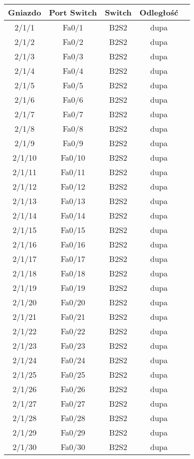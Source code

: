 \begin{center}
    \begin{longtable}{|c|c|c|c|c|}
    \hline
    Gniazdo & Port Switch & Switch & Odległość \\ \hline
	2/1/1 & Fa0/1 & B2S2 & dupa \\ \hline
	2/1/2 & Fa0/2 & B2S2 & dupa \\ \hline
	2/1/3 & Fa0/3 & B2S2 & dupa \\ \hline
	2/1/4 & Fa0/4 & B2S2 & dupa \\ \hline
	2/1/5 & Fa0/5 & B2S2 & dupa \\ \hline
	2/1/6 & Fa0/6 & B2S2 & dupa \\ \hline
	2/1/7 & Fa0/7 & B2S2 & dupa \\ \hline
	2/1/8 & Fa0/8 & B2S2 & dupa \\ \hline
	2/1/9 & Fa0/9 & B2S2 & dupa \\ \hline
	2/1/10 & Fa0/10 & B2S2 & dupa \\ \hline
	2/1/11 & Fa0/11 & B2S2 & dupa \\ \hline
	2/1/12 & Fa0/12 & B2S2 & dupa \\ \hline
	2/1/13 & Fa0/13 & B2S2 & dupa \\ \hline
	2/1/14 & Fa0/14 & B2S2 & dupa \\ \hline
	2/1/15 & Fa0/15 & B2S2 & dupa \\ \hline
	2/1/16 & Fa0/16 & B2S2 & dupa \\ \hline
	2/1/17 & Fa0/17 & B2S2 & dupa \\ \hline
	2/1/18 & Fa0/18 & B2S2 & dupa \\ \hline
	2/1/19 & Fa0/19 & B2S2 & dupa \\ \hline
	2/1/20 & Fa0/20 & B2S2 & dupa \\ \hline
	2/1/21 & Fa0/21 & B2S2 & dupa \\ \hline
	2/1/22 & Fa0/22 & B2S2 & dupa \\ \hline
	2/1/23 & Fa0/23 & B2S2 & dupa \\ \hline
	2/1/24 & Fa0/24 & B2S2 & dupa \\ \hline
	2/1/25 & Fa0/25 & B2S2 & dupa \\ \hline
	2/1/26 & Fa0/26 & B2S2 & dupa \\ \hline
	2/1/27 & Fa0/27 & B2S2 & dupa \\ \hline
	2/1/28 & Fa0/28 & B2S2 & dupa \\ \hline
	2/1/29 & Fa0/29 & B2S2 & dupa \\ \hline
	2/1/30 & Fa0/30 & B2S2 & dupa \\ \hline

\end{longtable}
\end{center}
